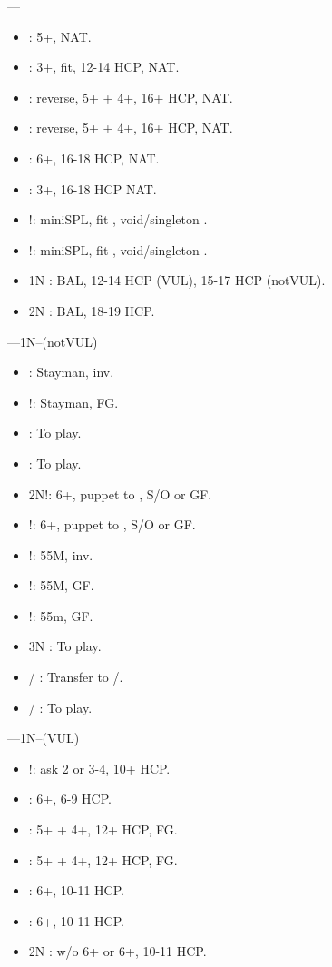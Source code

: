 \documentclass[12pt,twoside,a5paper]{report}%
\begin{document}
	----
	\begin{itemize}
	\renewcommand{\labelitemi}{}
	\item {} : 5+\cl{}, NAT.
	\item {} : 3+\di{}, fit, 12-14 HCP, NAT.
	\item {} : reverse, 5+\cl{} + 4+\he{}, 16+ HCP, NAT.
	\item {} : reverse, 5+\cl{} + 4+\sp{}, 16+ HCP, NAT.
	\item {} : 6+\cl{}, 16-18 HCP, NAT.
	\item {} : 3+\di{}, 16-18 HCP NAT.
	\item {}!: miniSPL, fit \di{}, void/singleton \he{}.
	\item {}!: miniSPL, fit \di{}, void/singleton \sp{}.
	\item 1N : BAL, 12-14 HCP (VUL), 15-17 HCP (notVUL).
	\item 2N : BAL, 18-19 HCP.
	\end{itemize}

	----1N--(notVUL)
	\begin{itemize}
	\renewcommand{\labelitemi}{}
	\item {} : Stayman, inv.
	\item {}!: Stayman, FG.
	\item {} : To play.
	\item {} : To play.
	\item 2N!: 6+\cl{}, puppet to , S/O or GF.
	\item {}!: 6+\di{}, puppet to , S/O or GF.
	\item {}!: 55M, inv.
	\item {}!: 55M, GF.
	\item {}!: 55m, GF.
	\item 3N : To play.
	\item {}/\di{} : Transfer to /\sp{}.
	\item {}/\sp{} : To play.
	\end{itemize}

	----1N--(VUL)
	\begin{itemize}
	\renewcommand{\labelitemi}{}
	\item {}!: ask 2\di{} or 3-4\cl{}, 10+ HCP.
	\item {} : 6+\di{}, 6-9 HCP.
	\item {} : 5+\di{} + 4+\he{}, 12+ HCP, FG.
	\item {} : 5+\di{} + 4+\sp{}, 12+ HCP, FG.
	\item {} : 6+\cl{}, 10-11 HCP.
	\item {} : 6+\di{}, 10-11 HCP.
	\item 2N : w/o 6+\cl{} or 6+\di{}, 10-11 HCP.
	\end{itemize}
\end{document}
